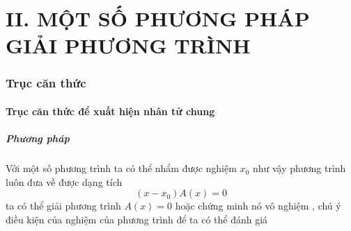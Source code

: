\setcounter{section}{0}
\part*{II. MỘT SỐ PHƯƠNG PHÁP GIẢI PHƯƠNG TRÌNH}
\section{ Trục căn thức }
\subsection{ Trục căn thức để xuất hiện nhân tử chung }
\subsubsection{Phương pháp}
Với một số phương trình ta có thể nhẩm được nghiệm $x_0$ như vậy phương trình luôn đưa về được dạng tích 
$$\left( {x - x_0 } \right)A\left( x \right) = 0$$ 
ta có thể giải phương trình 
$A\left( x \right) = 0$ hoặc chứng minh nó vô nghiệm , chú ý điều kiện của nghiệm của phương trình để ta có thể đánh giá
